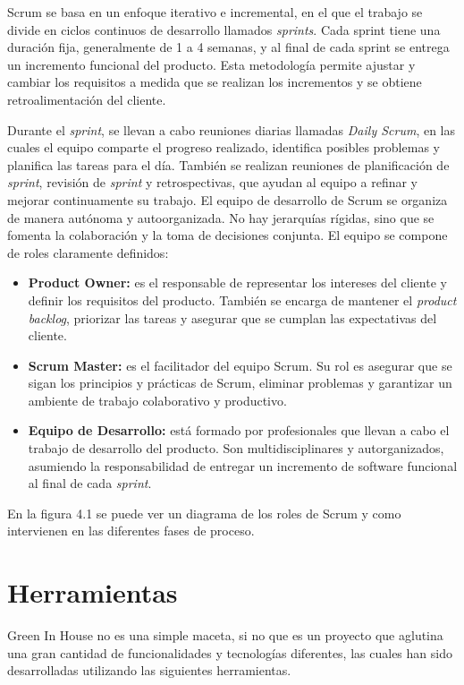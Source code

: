     Scrum se basa en un enfoque iterativo e incremental, en el que el trabajo se divide en ciclos continuos de desarrollo llamados \textit{sprints}. Cada sprint tiene una duración fija, generalmente de 1 a 4 semanas, y al final de cada sprint se entrega un incremento funcional del producto. Esta metodología permite ajustar y cambiar los requisitos a medida que se realizan los incrementos y se obtiene retroalimentación del cliente.
    
    Durante el \textit{sprint}, se llevan a cabo reuniones diarias llamadas \textit{Daily Scrum}, en las cuales el equipo comparte el progreso realizado, identifica posibles problemas y planifica las tareas para el día. También se realizan reuniones de planificación de \textit{sprint}, revisión de \textit{sprint} y retrospectivas, que ayudan al equipo a refinar y mejorar continuamente su trabajo.
    El equipo de desarrollo de Scrum se organiza de manera autónoma y autoorganizada. No hay jerarquías rígidas, sino que se fomenta la colaboración y la toma de decisiones conjunta. El equipo se compone de roles claramente definidos:
    \begin{itemize}
      \item \textbf{Product Owner:} es el responsable de representar los intereses del cliente y definir los requisitos del producto. También se encarga de mantener el \textit{product backlog}, priorizar las tareas y asegurar que se cumplan las expectativas del cliente.
      \item \textbf{Scrum Master:} es el facilitador del equipo Scrum. Su rol es asegurar que se sigan los principios y prácticas de Scrum, eliminar problemas y garantizar un ambiente de trabajo colaborativo y productivo.
      \item \textbf{Equipo de Desarrollo:} está formado por profesionales que llevan a cabo el trabajo de desarrollo del producto. Son multidisciplinares y autorganizados, asumiendo la responsabilidad de entregar un incremento de software funcional al final de cada \textit{sprint}.
    \end{itemize}
    En la figura 4.1 se puede ver un diagrama de los roles de Scrum y como intervienen en las diferentes fases de proceso.

\section{Herramientas}
Green In House no es una simple maceta, si no que es un proyecto que aglutina una gran cantidad de funcionalidades y tecnologías diferentes, las cuales han sido desarrolladas utilizando las siguientes herramientas.

